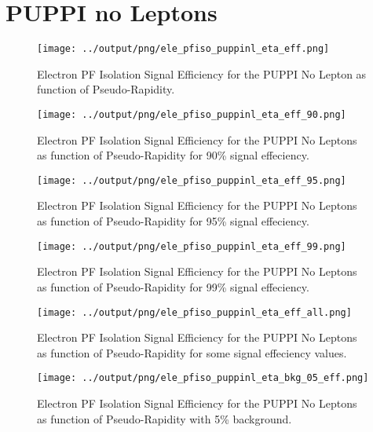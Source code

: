 \documentclass[11pt]{book}
\begin{document}
\section{PUPPI no Leptons}
\begin{figure}[htb]
\centering
\texttt{[image: ../output/png/ele\_pfiso\_puppinl\_eta\_eff.png]}
\caption{Electron PF Isolation Signal Efficiency for the PUPPI No Lepton as function of Pseudo-Rapidity.}
\label{fig:ele_pfiso_eta_eff_puppinl}
\end{figure}

\begin{figure}[htb]
\centering
\texttt{[image: ../output/png/ele\_pfiso\_puppinl\_eta\_eff\_90.png]}
\caption{Electron PF Isolation Signal Efficiency for the PUPPI No Leptons as function of Pseudo-Rapidity for 90\% signal effeciency.}
\label{fig:ele_pfiso_eta_eff_puppinl_eff_90}
\end{figure}

\begin{figure}[htb]
\centering
\texttt{[image: ../output/png/ele\_pfiso\_puppinl\_eta\_eff\_95.png]}
\caption{Electron PF Isolation Signal Efficiency for the PUPPI No Leptons as function of Pseudo-Rapidity for 95\% signal effeciency.}
\label{fig:ele_pfiso_eta_eff_puppinl_eff_95}
\end{figure}

\begin{figure}[htb]
\centering
\texttt{[image: ../output/png/ele\_pfiso\_puppinl\_eta\_eff\_99.png]}
\caption{Electron PF Isolation Signal Efficiency for the PUPPI No Leptons as function of Pseudo-Rapidity for 99\% signal effeciency.}
\label{fig:ele_pfiso_eta_eff_puppinl_eff_99}
\end{figure}

\begin{figure}[htb]
\centering
\texttt{[image: ../output/png/ele\_pfiso\_puppinl\_eta\_eff\_all.png]}
\caption{Electron PF Isolation Signal Efficiency for the PUPPI No Leptons as function of Pseudo-Rapidity for some signal effeciency values.}
\label{fig:ele_pfiso_eta_eff_puppinl_eff_all}
\end{figure}

\begin{figure}[htb]
\centering
\texttt{[image: ../output/png/ele\_pfiso\_puppinl\_eta\_bkg\_05\_eff.png]}
\caption{Electron PF Isolation Signal Efficiency for the PUPPI No Leptons as function of Pseudo-Rapidity with 5\% background.}
\label{fig:ele_pfiso_eta_bkg_puppinl_bkg_05_eff}
\end{figure}
\end{document}
